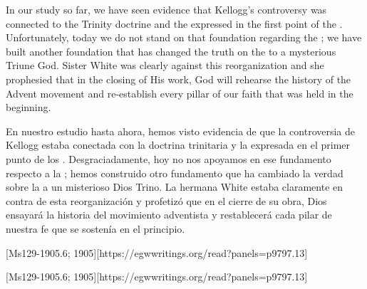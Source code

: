 



In our study so far, we have seen evidence that Kellogg’s controversy was connected to the Trinity doctrine and the  expressed in the first point of the . Unfortunately, today we do not stand on that foundation regarding the ; we have built another foundation that has changed the truth on the  to a mysterious Triune God. Sister White was clearly against this reorganization and she prophesied that in the closing of His work, God will rehearse the history of the Advent movement and re-establish every pillar of our faith that was held in the beginning.


En nuestro estudio hasta ahora, hemos visto evidencia de que la controversia de Kellogg estaba conectada con la doctrina trinitaria y la  expresada en el primer punto de los . Desgraciadamente, hoy no nos apoyamos en ese fundamento respecto a la ; hemos construido otro fundamento que ha cambiado la verdad sobre la  a un misterioso Dios Trino. La hermana White estaba claramente en contra de esta reorganización y profetizó que en el cierre de su obra, Dios ensayará la historia del movimiento adventista y restablecerá cada pilar de nuestra fe que se sostenía en el principio.


[Ms129-1905.6; 1905][https://egwwritings.org/read?panels=p9797.13]


[Ms129-1905.6; 1905][https://egwwritings.org/read?panels=p9797.13]


